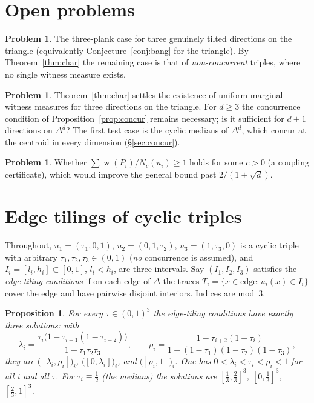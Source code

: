 \documentclass[11pt,reqno]{amsart}
\theoremstyle{plain}
\newtheorem{proposition}[theorem]{Proposition}
\theoremstyle{definition}
\newtheorem{problem}[theorem]{Problem}
\theoremstyle{remark}
\DeclareMathOperator{\wid}{w}
\begin{document}
\section{Open problems}
\begin{problem}
The three-plank case for three genuinely tilted directions on the triangle
(equivalently Conjecture~\ref{conj:bang} for the triangle). By
Theorem~\ref{thm:char} the remaining case is that of \emph{non-concurrent}
triples, where no single witness measure exists.
\end{problem}
\begin{problem}\label{prob:suff}
Theorem~\ref{thm:char} settles the existence of uniform-marginal witness
measures for three directions on the triangle. For $d\ge3$ the concurrence
condition of Proposition~\ref{prop:concur} remains necessary; is it sufficient
for $d+1$ directions on $\Delta^d$? The first test case is the cyclic medians
of $\Delta^d$, which concur at the centroid in every dimension
(\S\ref{sec:concur}).
\end{problem}
\begin{problem}
Whether $\sum\wid(P_i)/N_c(u_i)\ge1$ holds for some $c>0$ (a coupling certificate),
which would improve the general bound past $2/(1+\sqrt d)$.
\end{problem}

\appendix
\section{Edge tilings of cyclic triples}\label{app:tilings}

Throughout, $u_1=(\tau_1,0,1)$, $u_2=(0,1,\tau_2)$, $u_3=(1,\tau_3,0)$ is a
cyclic triple with arbitrary $\tau_1,\tau_2,\tau_3\in(0,1)$ (\emph{no}
concurrence is assumed), and $I_i=[l_i,h_i]\subset[0,1]$, $l_i<h_i$, are three
intervals. Say $(I_1,I_2,I_3)$ satisfies the \emph{edge-tiling conditions} if on
each edge of $\Delta$ the traces $T_i=\{x\in\text{edge}: u_i(x)\in I_i\}$ cover
the edge and have pairwise disjoint interiors. Indices are mod~$3$.

\begin{proposition}\label{prop:tilings}
For every $\tau\in(0,1)^3$ the edge-tiling conditions have exactly three
solutions: with
\[
\lambda_i=\frac{\tau_i\bigl(1-\tau_{i+1}(1-\tau_{i+2})\bigr)}{1+\tau_1\tau_2\tau_3},
\qquad
\rho_i=\frac{1-\tau_{i+2}(1-\tau_i)}{1+(1-\tau_1)(1-\tau_2)(1-\tau_3)},
\]
they are $\bigl([\lambda_i,\rho_i]\bigr)_i$, $\bigl([0,\lambda_i]\bigr)_i$, and
$\bigl([\rho_i,1]\bigr)_i$. One has $0<\lambda_i<\tau_i<\rho_i<1$ for all $i$ and
all $\tau$. For $\tau_i\equiv\tfrac12$ (the medians) the solutions are
$[\tfrac13,\tfrac23]^3$, $[0,\tfrac13]^3$, $[\tfrac23,1]^3$.
\end{proposition}
\end{document}
